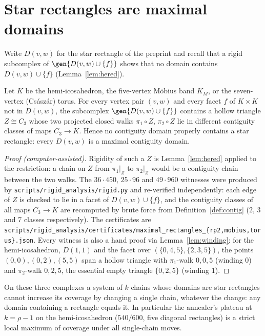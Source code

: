 \section{Star rectangles are maximal domains}

Write $D(v,w)$ for the star rectangle of the preprint and recall that a rigid subcomplex of $\gen{D(v,w)\cup\{f\}}$
shows that no domain contains $D(v,w)\cup\{f\}$ (Lemma~\ref{lem:hered}).

\begin{theorem}\label{thm:maximal}
Let $K$ be the hemi-icosahedron, the five-vertex M\"obius band $K_M$, or the seven-vertex (Cs\'asz\'ar) torus.
For every vertex pair $(v,w)$ and every facet $f$ of $K\times K$ not in $D(v,w)$, the subcomplex
$\gen{D(v,w)\cup\{f\}}$ contains a hollow triangle $Z\cong C_3$ whose two projected closed walks $\pi_1\circ Z$,
$\pi_2\circ Z$ lie in different contiguity classes of maps $C_3\to K$.  Hence no contiguity domain properly
contains a star rectangle: every $D(v,w)$ is a maximal contiguity domain.
\end{theorem}
\begin{proof}[Proof (computer-assisted)]
Rigidity of such a $Z$ is Lemma~\ref{lem:hered} applied to the restriction: a chain on $Z$ from $\pi_1|_Z$ to
$\pi_2|_Z$ would be a contiguity chain between the two walks.  The $36\cdot450$, $25\cdot96$ and $49\cdot960$
witnesses were produced by \texttt{scripts/rigid\_analysis/rigid.py} and re-verified independently: each edge of
$Z$ is checked to lie in a facet of $D(v,w)\cup\{f\}$, and the contiguity classes of all maps $C_3\to K$ are
recomputed by brute force from Definition~\ref{def:contig} ($2$, $3$ and $7$ classes respectively).  The
certificates are \texttt{scripts/rigid\_analysis/certificates/maximal\_rectangles\_\{rp2,mobius,torus\}.json}.
Every witness is also a hand proof via Lemma~\ref{lem:winding}: for the hemi-icosahedron, $D(1,1)$ and the facet
over $(\{0,4,5\},\{2,3,5\})$, the points $(0,0),(0,2),(5,5)$ span a hollow triangle with $\pi_1$-walk $0,0,5$
(winding $0$) and $\pi_2$-walk $0,2,5$, the essential empty triangle $\{0,2,5\}$ (winding $1$).
\end{proof}

\begin{corollary}
On these three complexes a system of $k$ chains whose domains are star rectangles cannot increase its coverage by
changing a single chain, whatever the change: any domain containing a rectangle equals it.  In particular the
annealer's plateau at $k=\rho-1$ on the hemi-icosahedron ($540/600$, five diagonal rectangles) is a strict local
maximum of coverage under all single-chain moves.
\end{corollary}

